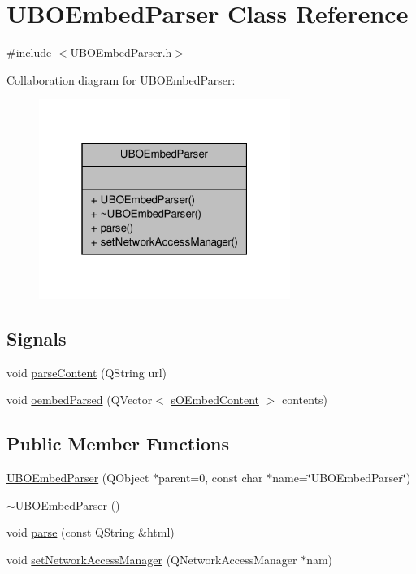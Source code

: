 \hypertarget{class_u_b_o_embed_parser}{\section{U\-B\-O\-Embed\-Parser Class Reference}
\label{db/d18/class_u_b_o_embed_parser}
}


{\ttfamily \#include $<$U\-B\-O\-Embed\-Parser.\-h$>$}



Collaboration diagram for U\-B\-O\-Embed\-Parser\-:
\nopagebreak
\begin{figure}[H]
\begin{center}
\leavevmode
\includegraphics[width=232pt]{d5/d8a/class_u_b_o_embed_parser__coll__graph}
\end{center}
\end{figure}
\subsection*{Signals}
\begin{DoxyCompactItemize}
\item 
void \hyperlink{class_u_b_o_embed_parser_ad15610669986881d4c34b3bd2720b71b}{parse\-Content} (Q\-String url)
\item 
void \hyperlink{class_u_b_o_embed_parser_ab0c16446cc9f72b15801af51fd3c64aa}{oembed\-Parsed} (Q\-Vector$<$ \hyperlink{structs_o_embed_content}{s\-O\-Embed\-Content} $>$ contents)
\end{DoxyCompactItemize}
\subsection*{Public Member Functions}
\begin{DoxyCompactItemize}
\item 
\hyperlink{class_u_b_o_embed_parser_a5a4ed9e5b654b7dc5ec19d6a93a4908e}{U\-B\-O\-Embed\-Parser} (Q\-Object $\ast$parent=0, const char $\ast$name=\char`\"{}U\-B\-O\-Embed\-Parser\char`\"{})
\item 
\hyperlink{class_u_b_o_embed_parser_a9acc7667a3ffe54fe20b6bbbf56c6d04}{$\sim$\-U\-B\-O\-Embed\-Parser} ()
\item 
void \hyperlink{class_u_b_o_embed_parser_a0195b4006db357e86d5d6428eba8a11e}{parse} (const Q\-String \&html)
\item 
void \hyperlink{class_u_b_o_embed_parser_ac40a71f895c09d2e0f508ae3f54259ab}{set\-Network\-Access\-Manager} (Q\-Network\-Access\-Manager $\ast$nam)
\end{DoxyCompactItemize}


